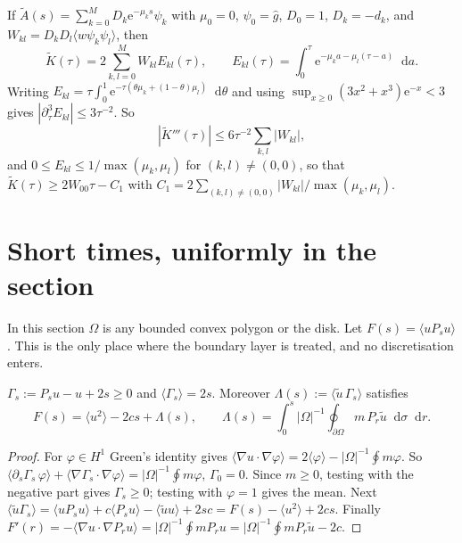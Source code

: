 \documentclass[11pt,a4paper]{report}
\DeclareRobustCommand*{\avg}[1]{\langle #1\rangle}
\DeclareRobustCommand*{\ut}{\tilde u}
\DeclareRobustCommand*{\dd}{\mathop{}\!\mathrm{d}}
\begin{document}
If \(\tilde A(s)=\sum_{k=0}^MD_k\mathrm e^{-\mu_ks}\psi_k\) with \(\mu_0=0\), \(\psi_0=\hat g\), \(D_0=1\), \(D_k=-d_k\), and
\(W_{kl}=D_kD_l\avg{w\psi_k\psi_l}\), then
\begin{equation}\label{eq:Ktilde}
\tilde K(\tau)=2\sum_{k,l=0}^MW_{kl}E_{kl}(\tau),\qquad E_{kl}(\tau)=\int_0^\tau\mathrm e^{-\mu_ka-\mu_l(\tau-a)}\dd a .
\end{equation}
Writing \(E_{kl}=\tau\int_0^1\mathrm e^{-\tau(\theta\mu_k+(1-\theta)\mu_l)}\dd\theta\) and using
\(\sup_{x\ge0}(3x^2+x^3)\mathrm e^{-x}<3\) gives \(|\partial_\tau^3E_{kl}|\le3\tau^{-2}\). So
\begin{equation}\label{eq:Taylor}
|\tilde K'''(\tau)|\le6\tau^{-2}\sum_{k,l}|W_{kl}|,
\end{equation}
and \(0\le E_{kl}\le1/\max(\mu_k,\mu_l)\) for \((k,l)\ne(0,0)\), so that \(\tilde K(\tau)\ge2W_{00}\tau-C_1\) with
\(C_1=2\sum_{(k,l)\ne(0,0)}|W_{kl}|/\max(\mu_k,\mu_l)\).

\section{Short times, uniformly in the section}\label{sec:short}

In this section \(\Omega\) is any bounded convex polygon or the disk. Let \(F(s)=\avg{uP_su}\). This is the only place
where the boundary layer is treated, and no discretisation enters.

\begin{lemma}\label{lem:layer}
\(\Gamma_s:=P_su-u+2s\ge0\) and \(\avg{\Gamma_s}=2s\). Moreover \(\Lambda(s):=\avg{\ut\,\Gamma_s}\) satisfies
\[
F(s)=\avg{u^2}-2cs+\Lambda(s),\qquad \Lambda(s)=\int_0^s|\Omega|^{-1}\oint_{\partial\Omega}m\,P_r\ut\dd\sigma\dd r .
\]
\end{lemma}
\begin{proof}
For \(\varphi\in H^1\) Green's identity gives \(\avg{\nabla u\cdot\nabla\varphi}=2\avg\varphi-|\Omega|^{-1}\oint m\varphi\). So
\(\avg{\partial_s\Gamma_s\,\varphi}+\avg{\nabla\Gamma_s\cdot\nabla\varphi}=|\Omega|^{-1}\oint m\varphi\), \(\Gamma_0=0\). Since \(m\ge0\),
testing with the negative part gives \(\Gamma_s\ge0\); testing with \(\varphi=1\) gives the mean. Next
\(\avg{\ut\Gamma_s}=\avg{uP_su}+c\avg{P_su}-\avg{\ut u}+2sc=F(s)-\avg{u^2}+2cs\). Finally
\(F'(r)=-\avg{\nabla u\cdot\nabla P_ru}=|\Omega|^{-1}\oint mP_ru=|\Omega|^{-1}\oint mP_r\ut-2c\).
\end{proof}
\end{document}
